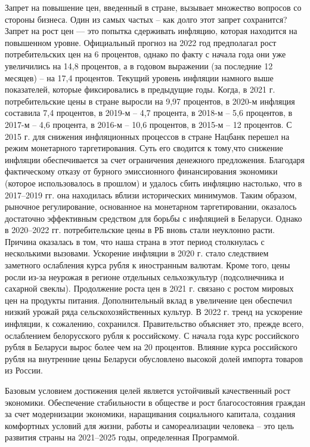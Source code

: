 \documentclass[14pt,a4paper]{article}
\begin{document}
    \par
    Запрет на повышение цен, введенный в стране, вызывает множество вопросов со стороны бизнеса.
    Один из самых частых – как долго этот запрет сохранится?
    Запрет на рост цен — это попытка сдерживать инфляцию, которая находится на повышенном уровне.
    Официальный прогноз на 2022 год предполагал рост потребительских цен на 6 процентов, однако по факту с начала года они уже увеличились на 14,8 процентов, а в годовом выражении (за последние 12 месяцев) – на 17,4 процентов.
    Текущий уровень инфляции намного выше показателей, которые фиксировались в предыдущие годы.
    Когда, в 2021 г. потребительские цены в стране выросли на 9,97 процентов, в 2020-м инфляция составила 7,4 процентов, в 2019-м – 4,7 процента, в 2018-м – 5,6 процентов, в 2017-м – 4,6 процента, в 2016-м – 10,6 процентов, в 2015-м – 12 процентов.
    С 2015 г. для снижения инфляционных процессов в стране Нацбанк перешел на режим монетарного таргетирования.
    Суть его сводится к тому,что снижение инфляции обеспечивается за счет ограничения денежного предложения.
    Благодаря фактическому отказу от бурного эмиссионного финансирования экономики (которое использовалось в прошлом) и удалось сбить инфляцию настолько, что в 2017–2019 гг. она находилась вблизи исторических минимумов.
    Таким образом, рыночное регулирование, основанное на монетарном таргетировании, оказалось достаточно эффективным средством для борьбы с инфляцией в Беларуси.
    Однако в 2020–2022 гг. потребительские цены в РБ вновь стали неуклонно расти. Причина оказалась в том, что наша страна в этот период столкнулась с несколькими вызовами.
    Ускорение инфляции в 2020 г. стало следствием заметного ослабления курса рубля к иностранным валютам.
    Кроме того, цены росли из-за неурожая в регионе отдельных сельхозкультур (подсолнечника и сахарной свеклы).
    Продолжение роста цен в 2021 г. связано с ростом мировых цен на продукты питания.
    Дополнительный вклад в увеличение цен обеспечил низкий урожай ряда сельскохозяйственных культур.
    В 2022 г. тренд на ускорение инфляции, к сожалению, сохранился.
    Правительство объясняет это, прежде всего, ослаблением белорусского рубля к российскому.
    С начала года курс российского рубля в Беларуси вырос более чем на 20 процентов.
    Влияние курса российского рубля на внутренние цены Беларуси обусловлено высокой долей импорта товаров из России.
    \par
    Базовым условием достижения целей является устойчивый качественный рост экономики.
    Обеспечение стабильности в обществе и рост благосостояния граждан за счет модернизации экономики, наращивания социального капитала, создания комфортных условий для жизни, работы и самореализации человека – это цель развития страны на 2021–2025 годы, определенная Программой.
\end{document}
